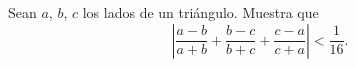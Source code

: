 Sean $a$, $b$, $c$ los lados de un triángulo. Muestra que
\[\left|\frac{a-b}{a+b}+\frac{b-c}{b+c}+\frac{c-a}{c+a}\right|\lt\frac{1}{16}.\]
